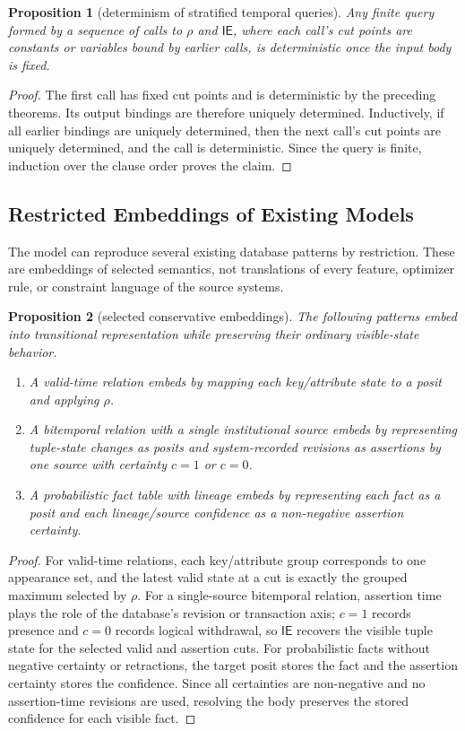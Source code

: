 \documentclass[a4paper,fleqn]{cas-sc}
\newcommand{\ie}{\mathsf{IE}}
\newenvironment{criteria}{%
  \begin{enumerate}
  \renewcommand{\labelenumi}{\footnotesize\arabic{enumi}}%
  \setlength{\itemsep}{0.3ex}%
  \setlength{\parsep}{0pt}%
}{%
  \end{enumerate}
}
\theoremstyle{plain}
\newtheorem{proposition}{Proposition}
\theoremstyle{remark}
\begin{document}
\begin{proposition}[determinism of stratified temporal queries]
Any finite query formed by a sequence of calls to \(\rho\) and \(\ie\), where each call's cut points are constants or variables bound by earlier calls, is deterministic once the input body is fixed.
\end{proposition}

\begin{proof}
The first call has fixed cut points and is deterministic by the preceding theorems. Its output bindings are therefore uniquely determined. Inductively, if all earlier bindings are uniquely determined, then the next call's cut points are uniquely determined, and the call is deterministic. Since the query is finite, induction over the clause order proves the claim.
\end{proof}

\subsection{Restricted Embeddings of Existing Models}
The model can reproduce several existing database patterns by restriction. These are embeddings of selected semantics, not translations of every feature, optimizer rule, or constraint language of the source systems.

\begin{proposition}[selected conservative embeddings]
The following patterns embed into transitional representation while preserving their ordinary visible-state behavior.
\begin{criteria}
\item A valid-time relation embeds by mapping each key/attribute state to a posit and applying \(\rho\).
\item A bitemporal relation with a single institutional source embeds by representing tuple-state changes as posits and system-recorded revisions as assertions by one source with certainty \(c=1\) or \(c=0\).
\item A probabilistic fact table with lineage embeds by representing each fact as a posit and each lineage/source confidence as a non-negative assertion certainty.
\end{criteria}
\end{proposition}

\begin{proof}
For valid-time relations, each key/attribute group corresponds to one appearance set, and the latest valid state at a cut is exactly the grouped maximum selected by \(\rho\). For a single-source bitemporal relation, assertion time plays the role of the database's revision or transaction axis; \(c=1\) records presence and \(c=0\) records logical withdrawal, so \(\ie\) recovers the visible tuple state for the selected valid and assertion cuts. For probabilistic facts without negative certainty or retractions, the target posit stores the fact and the assertion certainty stores the confidence. Since all certainties are non-negative and no assertion-time revisions are used, resolving the body preserves the stored confidence for each visible fact.
\end{proof}
\end{document}

